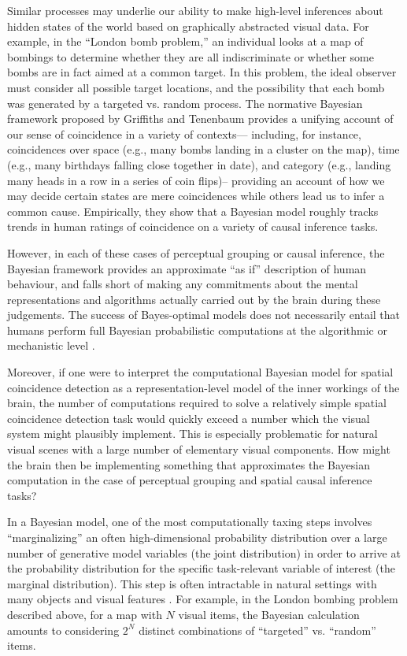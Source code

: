 \documentclass{article}
\begin{document}
Similar processes may underlie our ability to make high-level inferences about hidden states of the world based on graphically abstracted visual data. For example, in the ``London bomb problem,'' an individual looks at a map of bombings to determine whether they are all indiscriminate or whether some bombs are in fact aimed at a common target. In this problem, the ideal observer must consider all possible target locations, and the possibility that each bomb was generated by a targeted vs. random process. The normative Bayesian framework proposed by Griffiths and Tenenbaum \cite{griffiths2007mere} provides a  unifying account of our sense of coincidence in a variety of contexts— including, for instance, coincidences over space (e.g., many bombs landing in a cluster on the map), time (e.g., many birthdays falling close together in date), and category (e.g., landing many heads in a row in a series of coin flips)-- providing an account of how we may decide certain states are mere coincidences while others lead us to infer a common cause. Empirically, they show that a Bayesian model roughly tracks trends in human ratings of coincidence on a variety of causal inference tasks.

However, in each of these cases of perceptual grouping or causal inference, the Bayesian framework provides an approximate ``as if'' description of human behaviour, and falls short of making any commitments about the mental representations and algorithms actually carried out by the brain during these judgements. The success of Bayes-optimal models does not necessarily entail that humans perform full Bayesian probabilistic computations at the algorithmic or mechanistic level \cite{jones2011bayesian, maloney2009bayesian}.

Moreover, if one were to interpret the computational Bayesian model for spatial coincidence detection as a representation-level model of the inner workings of the brain, the number of computations required to solve a relatively simple spatial coincidence detection task would quickly exceed a number which the visual system might plausibly implement. This is especially problematic for natural visual scenes with a large number of elementary visual components. How might the brain then be implementing something that approximates the Bayesian computation in the case of perceptual grouping and spatial causal inference tasks?

In a Bayesian model, one of the most computationally taxing steps involves ``marginalizing'' an often high-dimensional probability distribution over a large number of generative model variables (the joint distribution) in order to arrive at the probability distribution for the specific task-relevant variable of interest (the marginal distribution). This step is often intractable in natural settings with many objects and visual features \cite{pouget2013probabilistic}. For example, in the London bombing problem described above, for a map with $N$ visual items, the Bayesian calculation amounts to considering $2^N$ distinct combinations of ``targeted” vs. ``random” items. 
\end{document}
